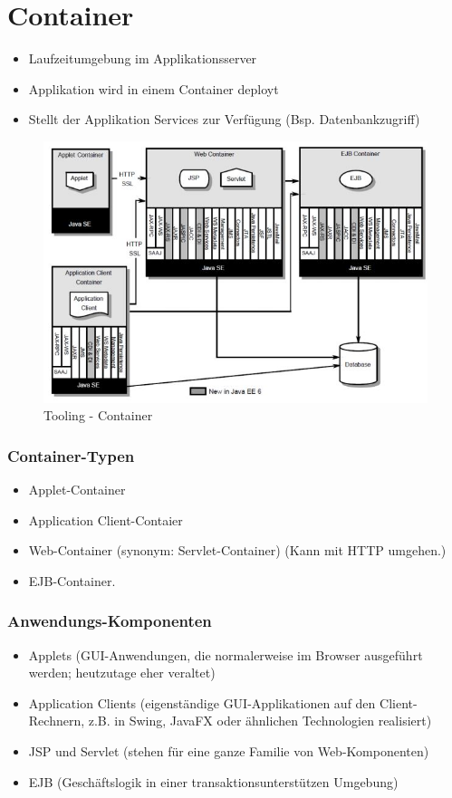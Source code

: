 \section{Container}
\begin{itemize}
	\item Laufzeitumgebung im Applikationsserver
	\item Applikation wird in einem Container deployt
	\item Stellt der Applikation Services zur Verfügung (Bsp. Datenbankzugriff)
\end{itemize}

\begin{figure}[h!]
\centering
\includegraphics[width=0.7\linewidth]{fig/tooling-container}
\caption{Tooling - Container}
\label{fig:tooling-container}
\end{figure}

\subsubsection{Container-Typen}
\begin{itemize}
	\item Applet-Container
	\item Application Client-Contaier
	\item Web-Container (synonym: Servlet-Container) (Kann mit HTTP umgehen.)
	\item EJB-Container.
\end{itemize}

\subsubsection{Anwendungs-Komponenten}
\begin{itemize}
	\item Applets (GUI-Anwendungen, die normalerweise im Browser ausgeführt werden; heutzutage eher veraltet)
	\item Application Clients (eigenständige GUI-Applikationen auf den Client-Rechnern, z.B. in Swing, JavaFX oder ähnlichen Technologien realisiert)
	\item JSP und Servlet (stehen für eine ganze Familie von Web-Komponenten)
	\item EJB (Geschäftslogik in einer transaktionsunterstützen Umgebung)
\end{itemize}


